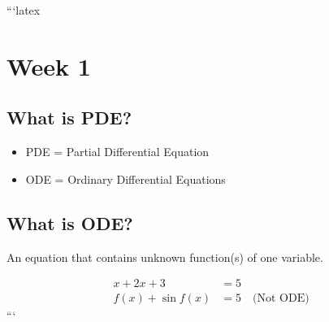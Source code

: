 ```latex
\section*{Week 1}

\subsection*{What is PDE?}

\begin{itemize}
    \item PDE = Partial Differential Equation
    \item ODE = Ordinary Differential Equations
\end{itemize}

\subsection*{What is ODE?}

An equation that contains unknown function(s) of one variable.

\begin{align*}
    x + 2x + 3 &= 5 \\
    f(x) + \sin f(x) &= 5 \quad \text{(Not ODE)}
\end{align*}
```
